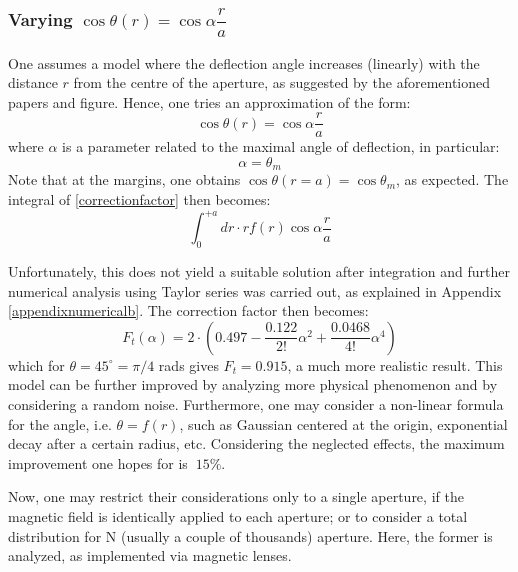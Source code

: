 \documentclass[twocolumn,12pt]{article}
\numberwithin{equation}{section} %
\numberwithin{equation}{section}
\begin{document}
\subsubsection{Varying $\cos \theta(r) = \cos \alpha \dfrac{r}{a}$}
\label{varyingtheta}
One assumes a model where the deflection angle increases (linearly) with the distance $r$ from the centre of the aperture, as suggested by the aforementioned papers and figure. Hence, one tries an approximation of the form:
\begin{equation}
\cos \theta(r) = \cos \alpha \dfrac{r}{a}
\end{equation}
where $\alpha$ is a parameter related to the maximal angle of deflection, in particular:
\begin{equation}
    \alpha = \theta_m
\end{equation}
Note that at the margins, one obtains $\cos \theta (r=a) = \cos \theta_m$, as expected. The integral of \ref{correctionfactor} then becomes:
\begin{equation}
    \int_{0}^{+a} dr \cdot r f(r) \cos \alpha \dfrac{r}{a} 
    \label{complicatedintegral}
\end{equation}

Unfortunately, this does not yield a suitable solution after integration and further numerical analysis using Taylor series was carried out, as explained in Appendix \ref{appendixnumericalb}. The correction factor then becomes:
\begin{equation}
    F_t(\alpha) =   2 \cdot ( 0.497 - \dfrac{0.122}{2!} \alpha ^2 + \dfrac{0.0468}{4!} \alpha^4)
    \label{finalequation}
\end{equation}
which for $\theta = 45^{\circ} = \pi/4$ rads gives $F_t = 0.915$, a much more realistic result. This model can be further improved by analyzing more physical phenomenon and by considering a random noise. Furthermore, one may consider a non-linear formula for the angle, i.e. $\theta = f(r)$, such as Gaussian centered at the origin, exponential decay after a certain radius, etc. Considering the neglected effects, the maximum improvement one hopes for is $~15\%$.

Now, one may restrict their considerations only to a single aperture, if the magnetic field is identically applied to each aperture; or to consider a total distribution for N (usually a couple of thousands) aperture. Here, the former is analyzed, as implemented via magnetic lenses. 
\end{document}
